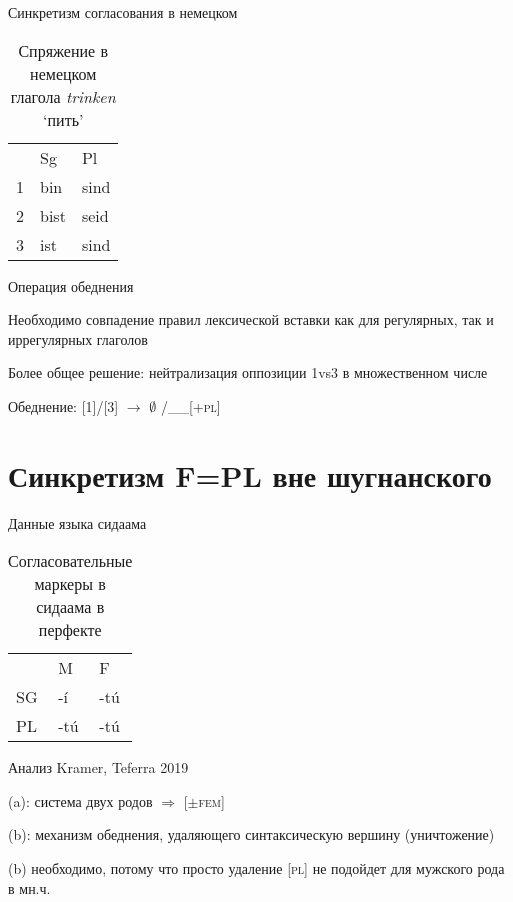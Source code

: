 \documentclass[xcolor=table]{beamer}
\begin{document}
\begin{frame}{Синкретизм согласования в немецком}

	\begin{table}[h]
\centering
\caption{Спряжение в немецком глагола \textit{trinken} `пить'}
\begin{tabular}{lll}
   & Sg                        & Pl                         \\
1 & bin         & \cellcolor[HTML]{FCFF2F}sind \\
2 & bist & seid \\
3 & ist & \cellcolor[HTML]{FCFF2F}sind
\end{tabular}
\end{table}

\end{frame}

\begin{frame}{Операция обеднения}

	Необходимо совпадение правил лексической вставки как для регулярных, так и иррегулярных глаголов

	Более общее решение: нейтрализация оппозиции 1vs3 в множественном числе

	Обеднение: [1]/[3] $\rightarrow$ $\emptyset$ /\_\_[+\textsc{pl}]

\end{frame}

\section{Синкретизм F=PL вне шугнанского}

\begin{frame}{Данные языка сидаама}

	\begin{table}[h]
\centering
\caption{Согласовательные маркеры в сидаама в перфекте}
\begin{tabular}{lll}
   & M                         & F                         \\
SG & -í                & \cellcolor[HTML]{FCFF2F}-tú \\
PL & \cellcolor[HTML]{FFFE65}-tú & \cellcolor[HTML]{FCFF2F}-tú
\end{tabular}
\end{table}
	
\end{frame}

\begin{frame}{Анализ Kramer, Teferra 2019}

	(a): система двух родов $\Rightarrow$ [$\pm$\textsc{fem}]

	(b): механизм обеднения, удаляющего синтаксическую вершину (уничтожение)

	(b) необходимо, потому что просто удаление [\textsc{pl}] не подойдет для мужского рода в мн.ч.

\end{frame}
\end{document}
